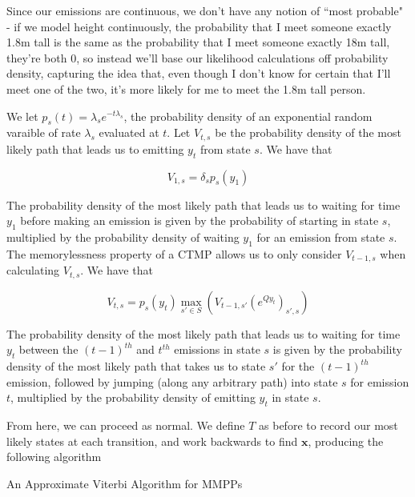 Since our emissions are continuous, we don't have any notion of ``most probable" - if we model height continuously, the probability that I meet someone exactly 1.8m tall is the same as the probability that I meet someone exactly 18m tall, they're both 0, so instead we'll base our likelihood calculations off probability density, capturing the idea that, even though I don't know for certain that I'll meet one of the two, it's more likely for me to meet the 1.8m tall person.

We let $p_s(t)= \lambda_s e^{-t\lambda_s}$, the probability density of an exponential random varaible of rate $\lambda_s$ evaluated at $t$. Let $V_{t,s}$ be the probability density of the most likely path that leads us to emitting $y_t$ from state $s$. We have that

$$
V_{1,s} =  \delta_{s}p_s(y_1)
$$

The probability density of the most likely path that leads us to waiting for time $y_1$ before making an emission is given by the probability of starting in state $s$, multiplied by the probability density of waiting $y_1$ for an emission from state $s$. The memorylessness property of a CTMP allows us to only consider $V_{t-1,s}$ when calculating $V_{t,s}$. We have that

$$
V_{t,s} = p_s(y_t) \max_{s'\in S} (V_{t-1,s'}(e^{Qy_t})_{s',s})
$$

The probability density of the most likely path that leads us to waiting for time $y_t$ between the $(t-1)^{th}$ and $t^{th}$ emissions in state $s$ is given by the probability density of the most likely path that takes us to state $s'$ for the $(t-1)^{th}$ emission, followed by jumping (along any arbitrary path) into state $s$ for emission $t$, multiplied by the probability density of emitting $y_t$ in state $s$.

From here, we can proceed as normal. We define $T$ as before to record our most likely states at each transition, and work backwards to find $\mathbf{x}$, producing the following algorithm

\begin{algorithm}
\SetAlgoLined
{}

\caption{An Approximate Viterbi Algorithm for MMPPs}

\end{algorithm}

